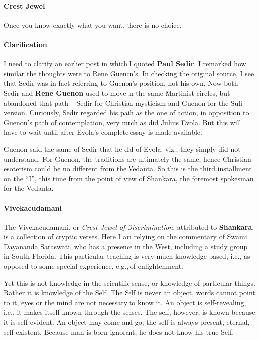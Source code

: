 \paragraph{Crest Jewel}

\begin{quotex}
Once you know exactly what you want, there is no choice.
\end{quotex}


\paragraph{Clarification}


I need to clarify an earlier post in which I quoted \textbf{Paul Sedir}. I remarked how similar the thoughts were to Rene Guenon's. In checking the original source, I see that Sedir was in fact referring to Guenon's position, not his own. Now both Sedir and \textbf{Rene Guenon} used to move in the same Martinist circles, but abandoned that path -- Sedir for Christian mysticism and Guenon for the Sufi version. Curiously, Sedir regarded his path as the one of action, in opposition to Guenon's path of contemplation, very much as did Julius Evola. But this will have to wait until after Evola's complete essay is made available.

Guenon said the same of Sedir that he did of Evola: viz., they simply did not understand. For Guenon, the traditions are ultimately the same, hence Christian esoterism could be no different from the Vedanta. So this is the third installment on the ``I'', this time from the point of view of Shankara, the foremost spokesman for the Vedanta.

\paragraph{Vivekacudamani}


The Vivekacudamani, or \textit{Crest Jewel of Discrimination}, attributed to \textbf{Shankara}, is a collection of cryptic verses. Here I am relying on the commentary of Swami Dayananda Saraswati, who has a presence in the West, including a study group in South Florida. This particular teaching is very much knowledge based, i.e., as opposed to some special experience, e.g., of enlightenment.

Yet this is not knowledge in the scientific sense, or knowledge of particular things. Rather it is knowledge of the Self. The Self is never an object, words cannot point to it, eyes or the mind are not necessary to know it. An object is self-revealing, i.e., it makes itself known through the senses. The self, however, is known because it is self-evident. An object may come and go; the self is always present, eternal, self-existent. Because man is born ignorant, he does not know his true Self.

